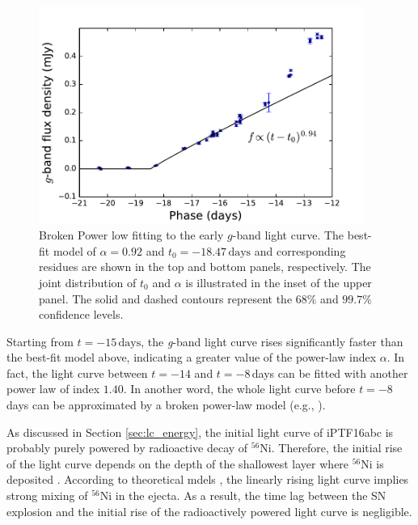 \documentclass[twocolumn]{aastex61}
\begin{document}
\begin{figure}[htb]
  \centering
  \includegraphics[width=0.95\textwidth]{early_lc.pdf}
  \caption{Broken Power low fitting to the early $g$-band light
    curve. The best-fit model of $\alpha=0.92$ and $t_0=-18.47\,\textrm{days}$
    and corresponding residues are shown in the top and bottom panels, respectively.
    The joint distribution of $t_0$ and $\alpha$ is illustrated in the inset of
    the upper panel. The solid and dashed contours represent the $68\%$ and $99.7\%$
    confidence levels.
  }
  \label{fig:early_lc_fit}
\end{figure}

Starting from $t=-15\,\textrm{days}$, the \textit{g}-band light curve
rises significantly faster than the best-fit model above, indicating a
greater value of the power-law index $\alpha$. In fact, the light
curve between $t=-14$ and $t=-8$\,days can be fitted with another
power law of index $1.40$. In another word, the whole light curve
before $t=-8$\,days can be approximated by a broken power-law model
(e.g.,
\citealt{2013ApJ...778L..15Z,2014ApJ...783L..24Z,2016arXiv161202097Z,
  2016arXiv161202725Z}).

As discussed in Section \ref{sec:lc_energy}, the initial light curve
of iPTF16abc is probably purely powered by radioactive decay of
$^{56}$Ni. Therefore, the initial rise of the light curve depends on
the depth of the shallowest layer where $^{56}$Ni is deposited
\citep{2014ApJ...784...85P}. According to theoretical mdels
\citep{2016ApJ...826...96P}, the linearly rising light curve implies
strong mixing of $^{56}$Ni in the ejecta. As a result, the time lag
between the SN explosion and the initial rise of the radioactively
powered light curve is negligible.
\end{document}
